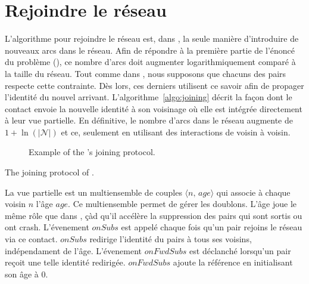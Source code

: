 \section{Rejoindre le réseau}

L'algorithme pour rejoindre le réseau est, dans \SPRAY, la seule manière
d'introduire de nouveaux arcs dans le réseau. Afin de répondre à la première
partie de l'énoncé du problème (\REF), ce nombre d'arcs doit augmenter
logarithmiquement comparé à la taille du réseau. Tout comme dans \SCAMP, nous
supposons que chacuns des pairs respecte cette contrainte. Dès lors, ces
derniers utilisent ce savoir afin de propager l'identité du nouvel
arrivant. L'algorithme~\ref{algo:joining} décrit la façon dont le contact envoie
la nouvelle identité à son voisinage où elle est intégrée directement à leur vue
partielle. En définitive, le nombre d'arcs dans le réseau augmente de
$1+\ln(|\mathcal{N}|)$ et ce, seulement en utilisant des interactions de voisin
à voisin.

\begin{figure*}
  \centering
  \hspace{8pt}
  \hspace{8pt}
  \caption{\label{net:fig:joiningexample}Example of the \SPRAY's joining
    protocol.}
\end{figure*}

\begin{algorithm}

\caption{\label{net:algo:joining}The joining protocol of \SPRAY.}
\end{algorithm}

La vue partielle est un multiensemble de couples $\langle n,\, age\rangle$ qui
associe à chaque voisin $n$ l'âge $age$. Ce multiensemble permet de gérer les
doublons. L'âge joue le même rôle que dans \CYCLON, çàd qu'il accélère la
suppression des pairs qui sont sortis ou ont crash. L'évenement $onSubs$ est
appelé chaque fois qu'un pair rejoins le réseau via ce contact. $onSubs$
redirige l'identité du pairs à tous ses voisins, indépendament de
l'âge. L'évenement $onFwdSubs$ est déclanché lorsqu'un pair reçoit une telle
identité redirigée. $onFwdSubs$ ajoute la référence en initialisant son âge à
$0$.

